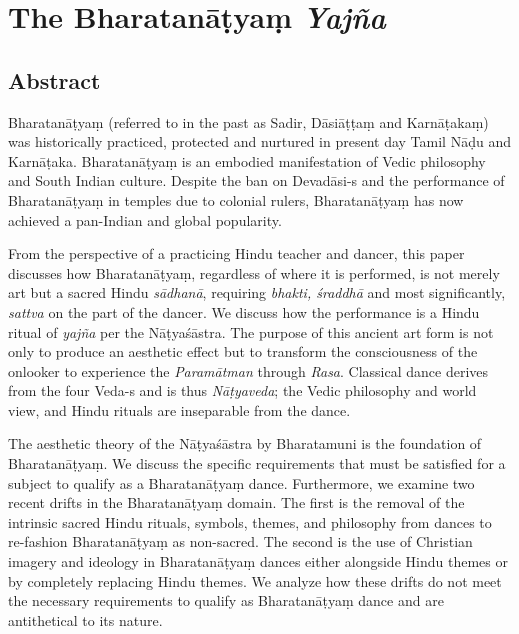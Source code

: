 
\chapter{The Bharatanāṭyaṃ \textit{Yajña}}\label{chap11}



\section*{Abstract}

Bharatanāṭyaṃ (referred to in the past as Sadir, Dāsiāṭṭaṃ and Karnāṭakaṃ) was historically practiced, protected and nurtured in present day Tamil Nāḍu and Karnāṭaka. Bharatanāṭyaṃ is an embodied manifestation of Vedic philosophy and South Indian culture. Despite the ban on Devadāsi-s and the performance of Bharatanāṭyaṃ in temples due to colonial rulers, Bharatanāṭyaṃ has now achieved a pan-Indian and global popularity.

From the perspective of a practicing Hindu teacher and dancer, this paper discusses how Bharatanāṭyaṃ, regardless of where it is performed, is not merely art but a sacred Hindu \textit{sādhanā}, requiring \textit{bhakti, śraddhā} and most significantly, \textit{sattva} on the part of the dancer. We discuss how the performance is a Hindu ritual of \textit{yajña} per the Nāṭyaśāstra. The purpose of this ancient art form is not only to produce an aesthetic effect but to transform the consciousness of the onlooker to experience the \textit{Paramātman} through \textit{Rasa}. Classical dance derives from the four Veda-s and is thus \textit{Nāṭyaveda}; the Vedic philosophy and world view, and Hindu rituals are inseparable from the dance.

The aesthetic theory of the Nāṭyaśāstra by Bharatamuni is the foundation of Bharatanāṭyaṃ. We discuss the specific requirements that must be satisfied for a subject to qualify as a Bharatanāṭyaṃ dance. Furthermore, we examine two recent drifts in the Bharatanāṭyaṃ domain. The first is the removal of the intrinsic sacred Hindu rituals, symbols, themes, and philosophy from dances to re-fashion Bharata\-nāṭyaṃ as non-sacred. The second is the use of Christian imagery and ideology in Bharatanāṭyaṃ dances either alongside Hindu themes or by completely replacing Hindu themes. We analyze how these drifts do not meet the necessary requirements to qualify as Bharatanāṭyaṃ dance and are antithetical to its nature.


